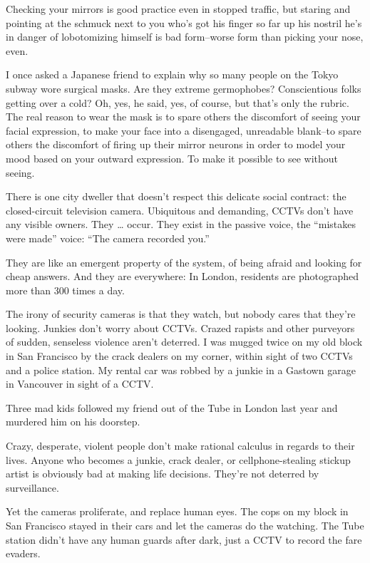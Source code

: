 Checking your mirrors is good practice even in stopped traffic, but
staring and pointing at the schmuck next to you who's got his
finger so far up his nostril he's in danger of lobotomizing himself
is bad form--worse form than picking your nose, even.

I once asked a Japanese friend to explain why so many people on the
Tokyo subway wore surgical masks. Are they extreme germophobes?
Conscientious folks getting over a cold? Oh, yes, he said, yes, of
course, but that's only the rubric. The real reason to wear the
mask is to spare others the discomfort of seeing your facial
expression, to make your face into a disengaged, unreadable
blank--to spare others the discomfort of firing up their mirror
neurons in order to model your mood based on your outward
expression. To make it possible to see without seeing.

There is one city dweller that doesn't respect this delicate social
contract: the closed-circuit television camera. Ubiquitous and
demanding, CCTVs don't have any visible owners. They \ldots{} occur.
They exist in the passive voice, the ``mistakes were made'' voice:
``The camera recorded you.''

They are like an emergent property of the system, of being afraid
and looking for cheap answers. And they are everywhere: In London,
residents are photographed more than 300 times a day.

The irony of security cameras is that they watch, but nobody cares
that they're looking. Junkies don't worry about CCTVs. Crazed
rapists and other purveyors of sudden, senseless violence aren't
deterred. I was mugged twice on my old block in San Francisco by
the crack dealers on my corner, within sight of two CCTVs and a
police station. My rental car was robbed by a junkie in a Gastown
garage in Vancouver in sight of a CCTV.

Three mad kids followed my friend out of the Tube in London last
year and murdered him on his doorstep.

Crazy, desperate, violent people don't make rational calculus in
regards to their lives. Anyone who becomes a junkie, crack dealer,
or cellphone-stealing stickup artist is obviously bad at making
life decisions. They're not deterred by surveillance.

Yet the cameras proliferate, and replace human eyes. The cops on my
block in San Francisco stayed in their cars and let the cameras do
the watching. The Tube station didn't have any human guards after
dark, just a CCTV to record the fare evaders.

